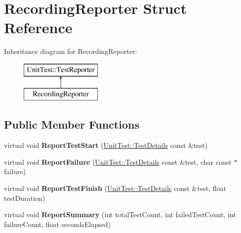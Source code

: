\hypertarget{structRecordingReporter}{\section{Recording\-Reporter Struct Reference}
\label{structRecordingReporter}
}
Inheritance diagram for Recording\-Reporter\-:\begin{figure}[H]
\begin{center}
\leavevmode
\includegraphics[height=2.000000cm]{structRecordingReporter}
\end{center}
\end{figure}
\subsection*{Public Member Functions}
\begin{DoxyCompactItemize}
\item 
\hypertarget{structRecordingReporter_a54f2108962d66c3d619cbe183b06a697}{virtual void {\bfseries Report\-Test\-Start} (\hyperlink{classUnitTest_1_1TestDetails}{Unit\-Test\-::\-Test\-Details} const \&test)}\label{structRecordingReporter_a54f2108962d66c3d619cbe183b06a697}

\item 
\hypertarget{structRecordingReporter_a8d71a40d918bf2394fc0771b152b4da3}{virtual void {\bfseries Report\-Failure} (\hyperlink{classUnitTest_1_1TestDetails}{Unit\-Test\-::\-Test\-Details} const \&test, char const $\ast$failure)}\label{structRecordingReporter_a8d71a40d918bf2394fc0771b152b4da3}

\item 
\hypertarget{structRecordingReporter_a076db0aaf4089fb2f4ed1afc58e1f5b3}{virtual void {\bfseries Report\-Test\-Finish} (\hyperlink{classUnitTest_1_1TestDetails}{Unit\-Test\-::\-Test\-Details} const \&test, float test\-Duration)}\label{structRecordingReporter_a076db0aaf4089fb2f4ed1afc58e1f5b3}

\item 
\hypertarget{structRecordingReporter_a48ee25cf86b9e1dcb4f3bccaca022169}{virtual void {\bfseries Report\-Summary} (int total\-Test\-Count, int failed\-Test\-Count, int failure\-Count, float seconds\-Elapsed)}\label{structRecordingReporter_a48ee25cf86b9e1dcb4f3bccaca022169}

\end{DoxyCompactItemize}
